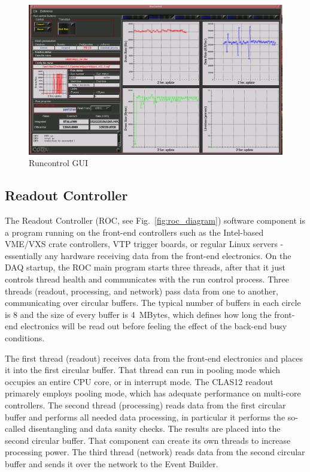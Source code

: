 \begin{figure}[hbt]
	\centering
	\includegraphics[width=1.0\columnwidth,keepaspectratio]{img/runcontrol1.png}
	\caption{Runcontrol GUI}
	\label{fig:runcontrol1}
\end{figure}





\subsection{Readout Controller}

The Readout Controller (ROC, see Fig.~\ref{fig:roc_diagram}) software component is a program running on the front-end controllers such as the Intel-based VME/VXS crate controllers, VTP trigger boards, or regular Linux servers - essentially any hardware receiving data from the front-end electronics. On the DAQ startup, the ROC main program starts three threads, after that it just controls thread health and communicates with the run control process. Three threads (readout, processing, and network) pass data from one to another, communicating over circular buffers. The typical number of buffers in each circle is 8 and the size of every buffer is 4~MBytes, which defines how long the front-end electronics will be read out before feeling the effect of the back-end busy conditions.

The first thread (readout) receives data from the front-end electronics and places it into the first circular buffer. That thread can run in pooling mode which occupies an entire CPU core, or in interrupt mode. The CLAS12 readout primarely employs pooling mode, which has adequate performance on multi-core controllers. The second thread (processing) reads data from the first circular buffer and performs all needed data processing, in particular it performs the so-called disentangling and data sanity checks. The results are placed into the second circular buffer. That component can create its own threads to increase processing power. The third thread (network) reads data from the second circular buffer and sends it over the network to the Event Builder.

